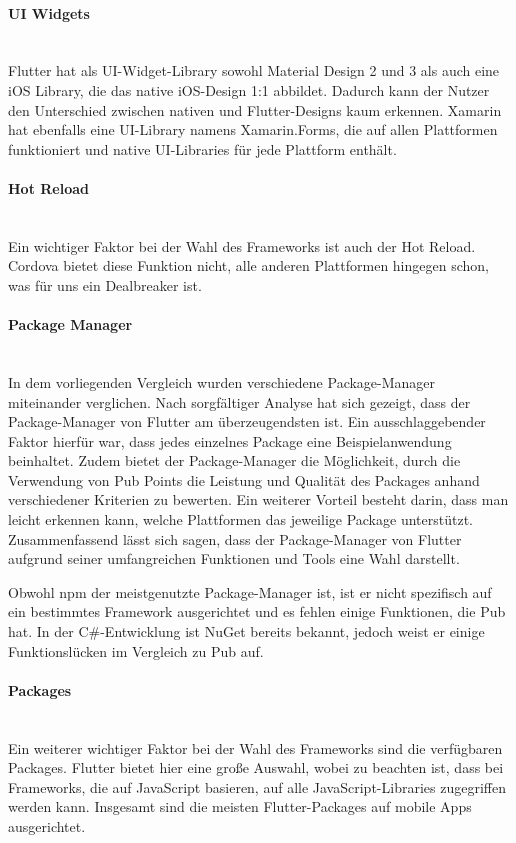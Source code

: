 \paragraph{UI Widgets}\mbox{} \\
Flutter hat als UI-Widget-Library sowohl Material Design 2 und 3 als auch eine iOS Library, die das native iOS-Design 1:1 abbildet. Dadurch kann der Nutzer den Unterschied zwischen nativen und Flutter-Designs kaum erkennen. Xamarin hat ebenfalls eine UI-Library namens Xamarin.Forms, die auf allen Plattformen funktioniert und native UI-Libraries für jede Plattform enthält.

\paragraph{Hot Reload}\mbox{} \\
Ein wichtiger Faktor bei der Wahl des Frameworks ist auch der Hot Reload. Cordova bietet diese Funktion nicht, alle anderen Plattformen hingegen schon, was für uns ein Dealbreaker ist.

\paragraph{Package Manager}\mbox{} \\
In dem vorliegenden Vergleich wurden verschiedene Package-Manager miteinander verglichen. Nach sorgfältiger Analyse hat sich gezeigt, dass der Package-Manager von Flutter am überzeugendsten ist. Ein ausschlaggebender Faktor hierfür war, dass jedes einzelnes Package eine Beispielanwendung beinhaltet. Zudem bietet der Package-Manager die Möglichkeit, durch die Verwendung von Pub Points die Leistung und Qualität des Packages anhand verschiedener Kriterien zu bewerten. Ein weiterer Vorteil besteht darin, dass man leicht erkennen kann, welche Plattformen das jeweilige Package unterstützt. Zusammenfassend lässt sich sagen, dass der Package-Manager von Flutter aufgrund seiner umfangreichen Funktionen und Tools eine Wahl darstellt.


Obwohl npm der meistgenutzte Package-Manager ist, ist er nicht spezifisch auf ein bestimmtes Framework ausgerichtet und es fehlen einige Funktionen, die Pub hat. In der C\#-Entwicklung ist NuGet bereits bekannt, jedoch weist er einige Funktionslücken im Vergleich zu Pub auf.

\paragraph{Packages}\mbox{} \\
Ein weiterer wichtiger Faktor bei der Wahl des Frameworks sind die verfügbaren Packages. Flutter bietet hier eine große Auswahl, wobei zu beachten ist, dass bei Frameworks, die auf JavaScript basieren, auf alle JavaScript-Libraries zugegriffen werden kann. Insgesamt sind die meisten Flutter-Packages auf mobile Apps ausgerichtet.

